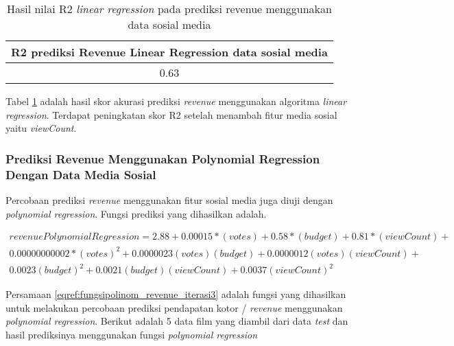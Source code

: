 \begin{table}[H]
\centering
\caption{Hasil nilai R2 \textit{linear regression} pada prediksi revenue menggunakan data sosial media }
\begin{tabular}{|c|}
 \hline 
 R2 prediksi Revenue Linear Regression data sosial media\\ 
 \hline 
 0.63 \\ 
 \hline 
 \end{tabular}  
 \label{tab:r2_linear_revenue_iterasi3}
\end{table}

Tabel \ref{tab:r2_linear_revenue_iterasi3} adalah hasil skor akurasi prediksi \textit{revenue} menggunakan algoritma \textit{linear regression}. Terdapat peningkatan skor R2 setelah menambah fitur media sosial yaitu \textit{viewCount}. 

\subsubsection{Prediksi Revenue Menggunakan Polynomial Regression Dengan Data Media Sosial}
Percobaan prediksi \textit{revenue} menggunakan fitur sosial media juga diuji dengan \textit{polynomial regression}. Fungsi prediksi yang dihasilkan adalah. 

\begin{equation}
\begin{split}
revenuePolynomialRegression = 2.88 + 0.00015 * (votes)  + 0.58 * (budget) + 0.81 * (viewCount) + \\ 0.00000000002 * (votes)^2 +  0.0000023 (votes) (budget) +  0.0000012 (votes)(viewCount) + \\  0.0023 (budget)^2 + 0.0021 (budget)(viewCount) + 0.0037 (viewCount)^2 
\end{split}
\label{eqref:fungsipolinom_revenue_iterasi3}
\end{equation}


Persamaan \ref{eqref:fungsipolinom_revenue_iterasi3} adalah fungsi yang dihasilkan untuk melakukan percobaan prediksi pendapatan kotor / \textit{revenue} menggunakan \textit{polynomial regression}. Berikut adalah 5 data film yang diambil dari data \textit{test} dan hasil prediksinya menggunakan fungsi \textit{polynomial regression}


